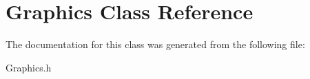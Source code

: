 \hypertarget{class_graphics}{\section{Graphics Class Reference}
\label{class_graphics}
}


The documentation for this class was generated from the following file\-:\begin{DoxyCompactItemize}
\item 
Graphics.\-h\end{DoxyCompactItemize}

